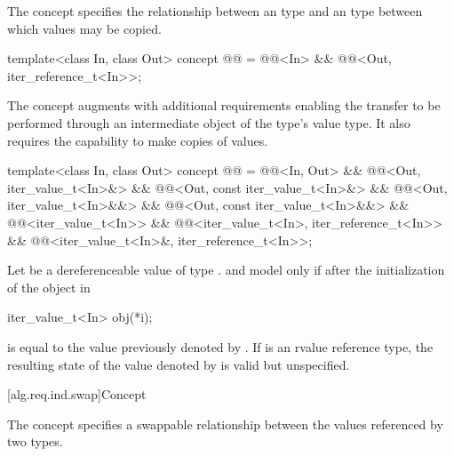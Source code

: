 \pnum
The  concept specifies the relationship between
an  type and an  type
between which values may be copied.

\begin{codeblock}
template<class In, class Out>
  concept @@ =
    @@<In> &&
    @@<Out, iter_reference_t<In>>;
\end{codeblock}

\pnum
The  concept augments
 with additional requirements enabling
the transfer to be performed through an intermediate object of the
 type's value type. It also requires the capability
to make copies of values.

\begin{codeblock}
template<class In, class Out>
  concept @@ =
    @@<In, Out> &&
    @@<Out, iter_value_t<In>&> &&
    @@<Out, const iter_value_t<In>&> &&
    @@<Out, iter_value_t<In>&&> &&
    @@<Out, const iter_value_t<In>&&> &&
    @@<iter_value_t<In>> &&
    @@<iter_value_t<In>, iter_reference_t<In>> &&
    @@<iter_value_t<In>&, iter_reference_t<In>>;
\end{codeblock}

\pnum
Let  be a dereferenceable value of type .
 and  model 
only if after the initialization of the object  in
\begin{codeblock}
iter_value_t<In> obj(*i);
\end{codeblock}
 is equal to the value previously denoted by . If
 is an rvalue reference type, the resulting state
of the value denoted by  is
valid but unspecified.

[alg.req.ind.swap]{Concept }

\pnum
The  concept specifies a swappable relationship
between the values referenced by two  types.


